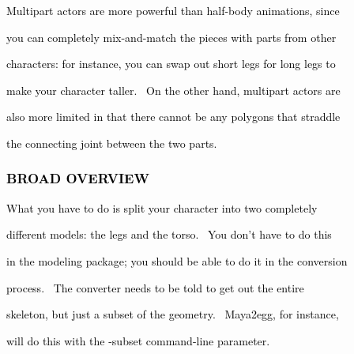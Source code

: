 \documentclass[a4paper]{article}
\newcommand\textstyleOOoComputerKeyWord[1]{\textrm{\textcolor[rgb]{0.0,0.0,0.5019608}{#1}}}
\begin{document}
\bigskip

{\color{black}
\textstyleOOoComputerKeyWord{\textcolor{black}{Multipart actors are more powerful than half-body animations, since}}}

{\color{black}
\textstyleOOoComputerKeyWord{\textcolor{black}{you can completely mix-and-match the pieces with parts from other}}}

{\color{black}
\textstyleOOoComputerKeyWord{\textcolor{black}{characters: for instance, you can swap out short legs for long legs to}}}

{\color{black}
\textstyleOOoComputerKeyWord{\textcolor{black}{make your character taller. \ On the other hand, multipart actors are}}}

{\color{black}
\textstyleOOoComputerKeyWord{\textcolor{black}{also more limited in that there cannot be any polygons that straddle}}}

{\color{black}
\textstyleOOoComputerKeyWord{\textcolor{black}{the connecting joint between the two parts.}}}


\bigskip


\bigskip

\subsubsection[BROAD OVERVIEW]{\textstyleOOoComputerKeyWord{\textcolor{black}{BROAD OVERVIEW}}}
\hypertarget{RefHeading7901869075401}{}
\bigskip

{\color{black}
\textstyleOOoComputerKeyWord{\textcolor{black}{What you have to do is split your character into two completely}}}

{\color{black}
\textstyleOOoComputerKeyWord{\textcolor{black}{different models: the legs and the torso. \ You don't have to do this}}}

{\color{black}
\textstyleOOoComputerKeyWord{\textcolor{black}{in the modeling package; you should be able to do it in the conversion}}}

{\color{black}
\textstyleOOoComputerKeyWord{\textcolor{black}{process. \ The converter needs to be told to get out the entire}}}

{\color{black}
\textstyleOOoComputerKeyWord{\textcolor{black}{skeleton, but just a subset of the geometry. \ Maya2egg, for instance,}}}

{\color{black}
\textstyleOOoComputerKeyWord{\textcolor{black}{will do this with the -subset command-line parameter.}}}


\bigskip
\end{document}
